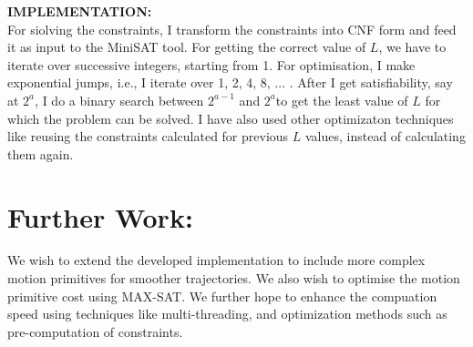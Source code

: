 \documentclass{article}[11pt]
\begin{document}
		\textbf{IMPLEMENTATION:}\\
			For siolving the constraints, I transform the constraints into CNF form and feed it as input to the MiniSAT tool. For getting the correct value of $L$, we have to iterate over successive integers, starting from 1. For optimisation, I make exponential jumps, i.e., I iterate over 1, 2, 4, 8, ... . After I get satisfiability, say at $2^a$, I do a binary search between $2^{a-1}$ and $2^a$to get the least value of $L$ for which the problem can be solved. I have also used other optimizaton techniques like reusing the constraints calculated for previous $L$ values, instead of calculating them again.

	\section{Further Work:}
		We wish to extend the developed implementation to include more complex motion primitives for smoother trajectories. We also wish to optimise the motion primitive cost using MAX-SAT. We further hope to enhance the compuation speed using techniques like multi-threading, and optimization methods such as pre-computation of constraints.
		
\end{document}
